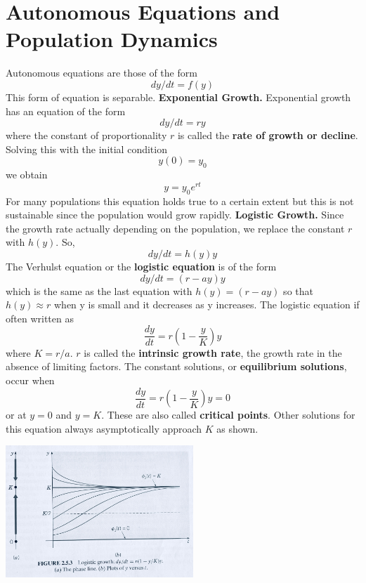\section{Autonomous Equations and Population Dynamics}
    Autonomous equations are those of the form
    \begin{equation*}
        dy/dt = f(y)
    \end{equation*}
    This form of equation is separable.
    \newline
    \textbf{Exponential Growth.} Exponential growth has an equation of the form 
    \begin{equation*}
        dy/dt = ry
    \end{equation*}
    where the constant of proportionality $r$ is called the \textbf{rate of growth or decline}. Solving this with the initial condition $$y(0) = y_0$$ we obtain $$y = y_0e^{rt}$$
    For many populations this equation holds true to a certain extent but this is not sustainable since the population would grow rapidly.
    \newline
    \textbf{Logistic Growth.} Since the growth rate actually depending on the population, we replace the constant $r$ with $h(y)$. So, 
    \begin{equation*}
        dy/dt = h(y)y
    \end{equation*}
    The Verhulst equation or the \textbf{logistic equation} is of the form
    \begin{equation*}
        dy/dt = (r-ay)y
    \end{equation*}
    which is the same as the last equation with $h(y) = (r - ay)$ so that $h(y) \approx r$ when y is small and it decreases as y increases. The logistic equation if often written as 
    \begin{equation*}
        \frac{dy}{dt} = r(1 - \frac{y}{K})y
    \end{equation*}
    where $K = r/a$. $r$ is called the \textbf{intrinsic growth rate}, the growth rate in the absence of limiting factors. 
    \newline \indent
    The constant solutions, or \textbf{equilibrium solutions}, occur when
    \begin{equation*}
        \frac{dy}{dt} = r(1 - \frac{y}{K})y = 0
    \end{equation*}
    or at $y = 0$ and $y = K$. These are also called \textbf{critical points}. 
    \newline \indent
    Other solutions for this equation always asymptotically approach $K$ as shown. 
    \begin{center}
        \includegraphics[width=200pt]{logistic_solutions.jpg}
    \end{center}
